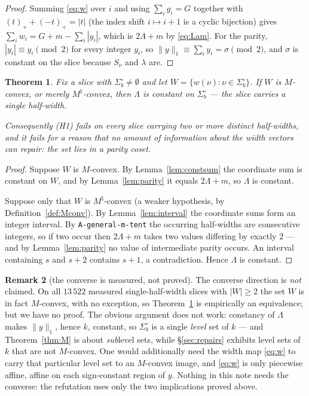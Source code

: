 \documentclass[11pt]{article}
\theoremstyle{plain}
\newtheorem{theorem}{Theorem}
\theoremstyle{definition}
\newtheorem{remark}[theorem]{Remark}
\newcommand{\pospart}[1]{\left(#1\right)_{+}}
\begin{document}
\begin{proof}
Summing \eqref{eq:w} over $i$ and using $\sum_i g_i=G$ together with
$\pospart{t}+\pospart{-t}=|t|$ (the index shift $i\mapsto i+1$ is a cyclic bijection) gives
$\sum_i w_i=G+m-\sum_i|y_i|$, which is $2\Lambda+m$ by \eqref{eq:Lam}. For the parity,
$|y_i|\equiv y_i\pmod 2$ for every integer $y_i$, so
$\|y\|_1\equiv\sum_i y_i=\sigma\pmod 2$, and $\sigma$ is constant on the slice because
$S_\nu$ and $\lambda$ are.
\end{proof}

\begin{theorem}\label{thm:R}
Fix a slice with $\Sigma_b^\circ\ne\emptyset$ and let $W=\{w(\nu):\nu\in\Sigma_b^\circ\}$.
If $W$ is $M$-convex, or merely $M^\natural$-convex, then $\Lambda$ is constant on
$\Sigma_b^\circ$ --- the slice carries a single half-width.

Consequently (H1) fails on every slice carrying two or more distinct half-widths, and it
fails for a reason that no amount of information about the width vectors can repair: the
set lies in a parity coset.
\end{theorem}

\begin{proof}
Suppose $W$ is $M$-convex. By Lemma~\ref{lem:constsum} the coordinate sum is constant on
$W$, and by Lemma~\ref{lem:parity} it equals $2\Lambda+m$, so $\Lambda$ is constant.

Suppose only that $W$ is $M^\natural$-convex (a weaker hypothesis, by
Definition~\ref{def:Mconv}). By Lemma~\ref{lem:interval} the coordinate sums form an
integer interval. By \texttt{A-general-m-tent} the occurring half-widths are consecutive
integers, so if two occur then $2\Lambda+m$ takes two values differing by exactly $2$ ---
and by Lemma~\ref{lem:parity} no value of intermediate parity occurs. An interval
containing $s$ and $s+2$ contains $s+1$, a contradiction. Hence $\Lambda$ is constant.
\end{proof}

\begin{remark}[the converse is measured, not proved]\label{rem:converse}
The converse direction is \emph{not} claimed. On all $13\,522$ measured single-half-width
slices with $|W|\ge2$ the set $W$ is in fact $M$-convex, with no exception, so
Theorem~\ref{thm:R} is empirically an equivalence; but we have no proof. The obvious
argument does not work: constancy of $\Lambda$ makes $\|y\|_1$, hence $k$, constant, so
$\Sigma_b^\circ$ is a single \emph{level} set of $k$ --- and
Theorem~\ref{thm:M} is about \emph{sub}level sets, while \S\ref{sec:repairs} exhibits
level sets of $k$ that are not $M$-convex. One would additionally need the width map
\eqref{eq:w} to carry that particular level set to an $M$-convex image, and \eqref{eq:w}
is only piecewise affine, affine on each sign-constant region of $y$. Nothing in this note
needs the converse: the refutation uses only the two implications proved above.
\end{remark}
\end{document}
